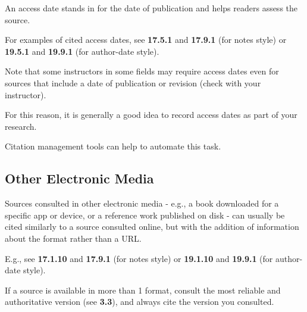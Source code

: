 \documentclass[oneside]{book}
\numberwithin{equation}{section}
\begin{document}
An access date stands in for the date of publication and helps readers assess the source.

For examples of cited access dates, see \textbf{17.5.1} and \textbf{17.9.1} (for notes style) or \textbf{19.5.1} and \textbf{19.9.1} (for author-date style).

Note that some instructors in some fields may require access dates even for sources that include a date of publication or revision (check with your instructor).

For this reason, it is generally a good idea to record access dates as part of your research.

Citation management tools can help to automate this task.

\subsection{Other Electronic Media}
Sources consulted in other electronic media - e.g., a book downloaded for a specific app or device, or a reference work published on disk - can usually be cited similarly to a source consulted online, but with the addition of information about the format rather than a URL.

E.g., see \textbf{17.1.10} and \textbf{17.9.1} (for notes style) or \textbf{19.1.10} and \textbf{19.9.1} (for author-date style).

%
If a source is available in more than 1 format, consult the most reliable and authoritative version (see \textbf{3.3}), and always cite the version you consulted.
\end{document}
